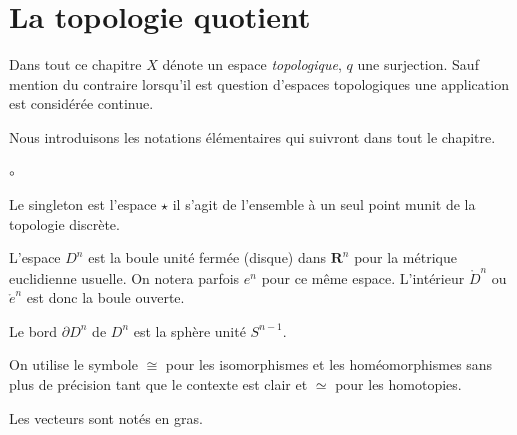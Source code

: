 \documentclass[main.tex]{subfiles}
\begin{document}
	\chapter{La topologie quotient}
	Dans tout ce chapitre $X$ dénote un espace \emph{topologique}, $q$ une surjection. Sauf mention du contraire lorsqu'il est question d'espaces topologiques une application est considérée continue.

	\begin{notation}
		Nous introduisons les notations élémentaires qui suivront dans tout le chapitre.
		\begin{list}{$\circ$}{}
			\item Le singleton est l'espace $\star$ il s'agit de l'ensemble à un seul point munit de la topologie discrète. 
			\item L'espace $D^n$ est la boule unité fermée (disque) dans $\mathbf{R}^{n}$ pour la métrique euclidienne usuelle. On notera parfois $e^{n}$ pour ce même espace. L'intérieur $\mathring{D}^n$ ou $\mathring{e}^n$ est donc la boule ouverte. 
			\item Le bord $\partial D^n$ de $D^n$ est la sphère unité $S^{n-1}$. 
			\item On utilise le symbole $\cong$ pour les isomorphismes et les homéomorphismes sans plus de précision tant que le contexte est clair et $\simeq$ pour les homotopies.
			\item Les vecteurs sont notés en gras.
		\end{list}
	\end{notation}
\end{document}
